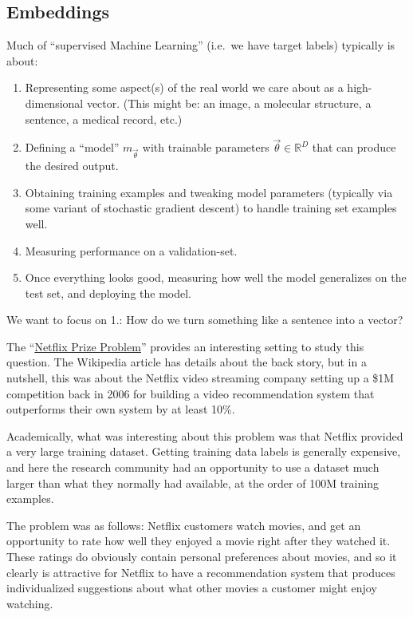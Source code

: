 \documentclass[11pt]{article}
\begin{document}
    \hypertarget{embeddings}{%
\subsection{Embeddings}\label{embeddings}}

Much of ``supervised Machine Learning'' (i.e.~we have target labels)
typically is about:

\begin{enumerate}
\def\labelenumi{\arabic{enumi}.}
\item
  Representing some aspect(s) of the real world we care about as a
  high-dimensional vector. (This might be: an image, a molecular
  structure, a sentence, a medical record, etc.)
\item
  Defining a ``model'' \(m_{\vec \theta}\) with trainable parameters
  \(\vec\theta\in\mathbb{R}^D\) that can produce the desired output.
\item
  Obtaining training examples and tweaking model parameters (typically
  via some variant of stochastic gradient descent) to handle training
  set examples well.
\item
  Measuring performance on a validation-set.
\item
  Once everything looks good, measuring how well the model generalizes
  on the test set, and deploying the model.
\end{enumerate}

We want to focus on 1.: How do we turn something like a sentence into a
vector?

The ``\href{https://en.wikipedia.org/wiki/Netflix_Prize}{Netflix Prize
Problem}'' provides an interesting setting to study this question. The
Wikipedia article has details about the back story, but in a nutshell,
this was about the Netflix video streaming company setting up a \$1M
competition back in 2006 for building a video recommendation system that
outperforms their own system by at least 10\%.

Academically, what was interesting about this problem was that Netflix
provided a very large training dataset. Getting training data labels is
generally expensive, and here the research community had an opportunity
to use a dataset much larger than what they normally had available, at
the order of 100M training examples.

The problem was as follows: Netflix customers watch movies, and get an
opportunity to rate how well they enjoyed a movie right after they
watched it. These ratings do obviously contain personal preferences
about movies, and so it clearly is attractive for Netflix to have a
recommendation system that produces individualized suggestions about
what other movies a customer might enjoy watching.
\end{document}
